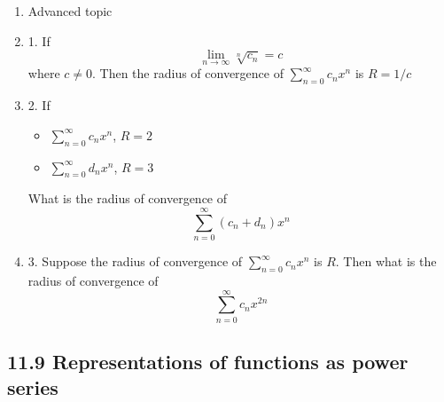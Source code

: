 \documentclass{article}
\begin{document}
\begin{enumerate}
\item Advanced topic
\item[] 1. If 
$$
\lim_{n\rightarrow \infty} \sqrt[n]{c_n} = c
$$
where $c\neq 0$. Then the radius of convergence of 
$\displaystyle\sum_{n=0}^\infty c_nx^n
$
is $R = 1/c$
\item [] 2. If 
\begin{itemize}
\item $\displaystyle\sum_{n=0}^\infty c_nx^n$, $R = 2$
\item $\displaystyle\sum_{n=0}^\infty d_nx^n$, $R = 3$
\end{itemize}
What is the radius of convergence of 
$$
\sum_{n=0}^\infty (c_n+d_n)x^n
$$
\item[] 3. Suppose the radius of convergence of 
$\displaystyle\sum_{n=0}^\infty c_nx^n$ is $R$. Then what is the radius of convergence of 
$$\displaystyle\sum_{n=0}^\infty c_nx^{2n}$$
\end{enumerate}


\subsection{11.9 Representations of functions as power series}
\end{document}
